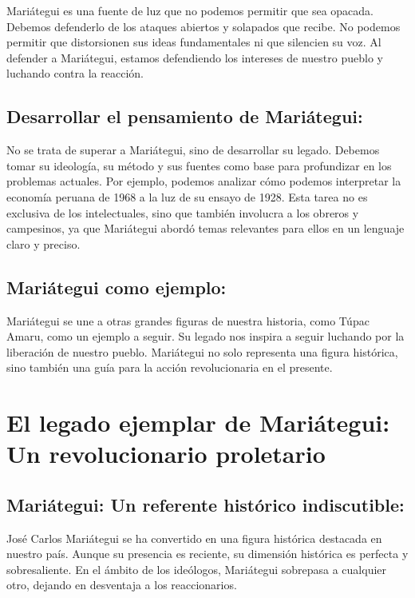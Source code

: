 \documentclass[
  jou,
  floatsintext,
  longtable,
  a4paper,
  nolmodern,
  notxfonts,
  notimes,
  12pt,
  colorlinks=true,linkcolor=blue,citecolor=blue,urlcolor=blue]{apa7}
\begin{document}
Mariátegui es una fuente de luz que no podemos permitir que sea opacada.
Debemos defenderlo de los ataques abiertos y solapados que recibe. No
podemos permitir que distorsionen sus ideas fundamentales ni que
silencien su voz. Al defender a Mariátegui, estamos defendiendo los
intereses de nuestro pueblo y luchando contra la reacción.

\subsection{Desarrollar el pensamiento de
Mariátegui:}\label{desarrollar-el-pensamiento-de-mariuxe1tegui}

No se trata de superar a Mariátegui, sino de desarrollar su legado.
Debemos tomar su ideología, su método y sus fuentes como base para
profundizar en los problemas actuales. Por ejemplo, podemos analizar
cómo podemos interpretar la economía peruana de 1968 a la luz de su
ensayo de 1928. Esta tarea no es exclusiva de los intelectuales, sino
que también involucra a los obreros y campesinos, ya que Mariátegui
abordó temas relevantes para ellos en un lenguaje claro y preciso.

\subsection{Mariátegui como ejemplo:}\label{mariuxe1tegui-como-ejemplo}

Mariátegui se une a otras grandes figuras de nuestra historia, como
Túpac Amaru, como un ejemplo a seguir. Su legado nos inspira a seguir
luchando por la liberación de nuestro pueblo. Mariátegui no solo
representa una figura histórica, sino también una guía para la acción
revolucionaria en el presente.

\section{El legado ejemplar de Mariátegui: Un revolucionario
proletario}\label{el-legado-ejemplar-de-mariuxe1tegui-un-revolucionario-proletario}

\subsection{Mariátegui: Un referente histórico
indiscutible:}\label{mariuxe1tegui-un-referente-histuxf3rico-indiscutible}

José Carlos Mariátegui se ha convertido en una figura histórica
destacada en nuestro país. Aunque su presencia es reciente, su dimensión
histórica es perfecta y sobresaliente. En el ámbito de los ideólogos,
Mariátegui sobrepasa a cualquier otro, dejando en desventaja a los
reaccionarios.
\end{document}

